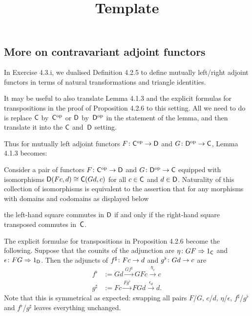 \documentclass[../../solutions]{subfiles}
\title{Template}
\author{}
\begin{document}
\maketitle

\subsection{More on contravariant adjoint functors}
\label{ssec:contravariant-extension}

In Exercise 4.3.i, we dualised Definition 4.2.5 to define mutually
left/right adjoint functors in terms of natural transformations and
triangle identities.

It may be useful to also translate Lemma 4.1.3 and the explicit
formulas for transpositions in the proof of Proposition 4.2.6 to this
setting.  All we need to do is replace ${\mathsf{C}}$ by~${\mathsf{C}}^{\mathrm{op}}$ or ${\mathsf{D}}$
by~${\mathsf{D}}^{\mathrm{op}}$ in the statement of the lemma, and then translate it into
the ${\mathsf{C}}$ and~${\mathsf{D}}$ setting.

Thus for mutually left adjoint functors ${F}\colon{{\mathsf{C}}^{\mathrm{op}}}\to{{\mathsf{D}}}$ and
${G}\colon{{\mathsf{D}}^{\mathrm{op}}}\to{{\mathsf{C}}}$, Lemma 4.1.3 becomes:
\begingroup
\renewcommand{\theHtheorem}{\theHsection.\arabic{theorem}.left}
\begin{lemma}
  Consider a pair of functors ${F}\colon{{\mathsf{C}}^{\mathrm{op}}}\to{{\mathsf{D}}}$ and
  ${G}\colon{{\mathsf{D}}^{\mathrm{op}}}\to{{\mathsf{C}}}$ equipped with isomorphisms
  ${\mathsf{D}}(Fc,d)\cong {\mathsf{C}}(Gd,c)$ for all $c\in{\mathsf{C}}$ and $d\in{\mathsf{D}}$.
  Naturality of this collection of isomorphisms is equivalent to the
  assertion that for any morphisms with domains and codomains as
  displayed below
  \begin{center}
  \end{center}
  the left-hand square commutes in ${\mathsf{D}}$ if and only if the right-hand
  square transposed commutes in~${\mathsf{C}}$.
\end{lemma}
\popthm
\endgroup

The explicit formulae for transpositions in Proposition 4.2.6 become
the following.  Suppose that the counits of the adjunction are
${\eta}\colon{GF}\Rightarrow{1_{\mathsf{C}}}$ and ${\epsilon}\colon{FG}\Rightarrow{1_{\mathsf{D}}}$.  Then the
adjuncts of ${f^\sharp}\colon{Fc}\to{d}$ and ${g^\flat}\colon{Gd}\to{c}$ are
\begin{align*}
  f^\flat &:= Gd \xrightarrow{Gf^\sharp} GFc \xrightarrow{\eta_c} c \\
  g^\sharp &:= Fc \xrightarrow{Fg^\flat} FGd \xrightarrow{\epsilon_d} d.
\end{align*}
Note that this is symmetrical as expected: swapping all pairs $F$/$G$,
$c$/$d$, $\eta$/$\epsilon$, $f^\sharp$/$g^\flat$ and
$f^\flat$/$g^\sharp$ leaves everything unchanged.
\end{document}
